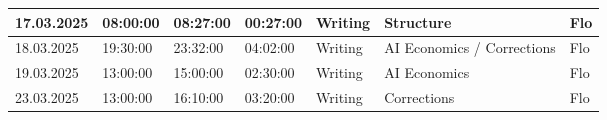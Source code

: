 \begin{longtable}{@{}p{1.8cm} p{1.2cm} p{1.2cm} p{1.2cm} p{2cm} p{4.5cm} p{2cm}@{}}
    \hline
    17.03.2025   & 08:00:00 & 08:27:00 & 00:27:00 & Writing & Structure & Flo \\
    \hline
    18.03.2025   & 19:30:00 & 23:32:00 & 04:02:00 & Writing & AI Economics / Corrections & Flo \\
    \hline
    19.03.2025   & 13:00:00 & 15:00:00 & 02:30:00 & Writing & AI Economics & Flo \\
    \hline
    23.03.2025   & 13:00:00 & 16:10:00 & 03:20:00 & Writing & Corrections & Flo \\
    \hline
    


\end{longtable}
